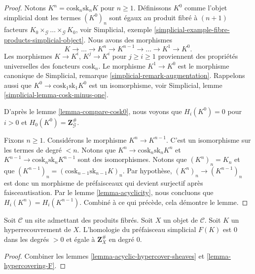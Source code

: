 \begin{proof}
Notons $K^n = \text{cosk}_n \text{sk}_n K$ pour $n \geq 1$.
Définissons $K^0$ comme l'objet simplicial dont les termes
$(K^0)_n$ sont égaux au produit fibré à $(n + 1)$ facteurs
$K_0 \times_\mathcal{G} \ldots \times_\mathcal{G} K_0$,
voir Simplicial,
exemple \ref{simplicial-example-fibre-products-simplicial-object}.
Nous avons des morphismes
$$
K \longrightarrow \ldots \to K^n \to K^{n - 1} \to \ldots \to K^1 \to K^0.
$$
Les morphismes $K \to K^i$, $K^j \to K^i$ pour $j \geq i \geq 1$ proviennent
des propriétés universelles des foncteurs $\text{cosk}_n$.
Le morphisme $K^1 \to K^0$ est le morphisme canonique
de
Simplicial, remarque \ref{simplicial-remark-augmentation}.
Rappelons aussi que $K^0 \to \text{cosk}_1 \text{sk}_1 K^0$
est un isomorphisme, voir
Simplicial, lemme \ref{simplicial-lemma-cosk-minus-one}.

\medskip\noindent
D'après le lemme \ref{lemma-compare-cosk0}, nous voyons que
$H_i(K^0) = 0$ pour $i > 0$ et $H_0(K^0) = \mathbf{Z}_\mathcal{G}^\#$.

\medskip\noindent
Fixons $n \geq 1$. Considérons le morphisme $K^n \to K^{n - 1}$.
C'est un isomorphisme sur les termes de degré $< n$.
Notons que $K^n \to \text{cosk}_n \text{sk}_n K^n$ et
$K^{n - 1} \to \text{cosk}_n \text{sk}_n K^{n - 1}$
sont des isomorphismes. Notons que $(K^n)_n = K_n$ et
que $(K^{n - 1})_n = (\text{cosk}_{n - 1} \text{sk}_{n - 1} K)_n$.
Par hypothèse, $(K^n)_n \to (K^{n - 1})_n$
est donc un morphisme de préfaisceaux qui devient surjectif après
faisceautisation. Par le lemme \ref{lemma-acyclicity}, nous concluons que
$H_i(K^n) = H_i(K^{n - 1})$.
Combiné à ce qui précède, cela démontre le lemme.
\end{proof}

\begin{lemma}
\label{lemma-hypercovering-acyclic}
Soit $\mathcal{C}$ un site admettant des produits fibrés.
Soit $X$ un objet de $\mathcal{C}$.
Soit $K$ un hyperrecouvrement de $X$.
L'homologie du préfaisceau simplicial $F(K)$ est
$0$ dans les degrés $> 0$ et égale à $\mathbf{Z}_X^\#$
en degré $0$.
\end{lemma}

\begin{proof}
Combiner les lemmes \ref{lemma-acyclic-hypercover-sheaves}
et \ref{lemma-hypercovering-F}.
\end{proof}












